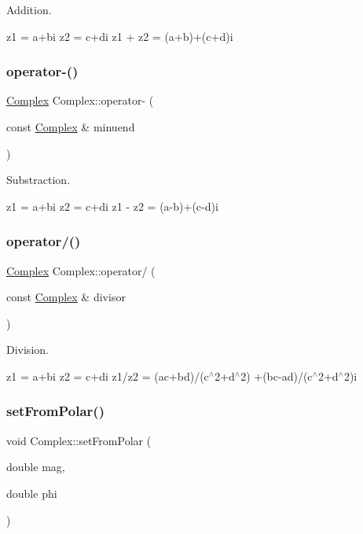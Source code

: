 Addition. 

z1 = a+bi z2 = c+di z1 + z2 = (a+b)+(c+d)i \mbox{\label{class_complex_a8f880f1056308d876fd50aad9244e8d2}} 
\subsubsection{\texorpdfstring{operator-\/()}{operator-()}}
{\footnotesize\ttfamily \mbox{\hyperlink{class_complex}{Complex}} Complex\+::operator-\/ (\begin{DoxyParamCaption}\item[{const \mbox{\hyperlink{class_complex}{Complex}} \&}]{minuend }\end{DoxyParamCaption})}



Substraction. 

z1 = a+bi z2 = c+di z1 -\/ z2 = (a-\/b)+(c-\/d)i \mbox{\label{class_complex_a365fd33e7bc67fde80e79c514aab95bc}} 
\subsubsection{\texorpdfstring{operator/()}{operator/()}}
{\footnotesize\ttfamily \mbox{\hyperlink{class_complex}{Complex}} Complex\+::operator/ (\begin{DoxyParamCaption}\item[{const \mbox{\hyperlink{class_complex}{Complex}} \&}]{divisor }\end{DoxyParamCaption})}



Division. 

z1 = a+bi z2 = c+di z1/z2 = (ac+bd)/(c$^\wedge$2+d$^\wedge$2) +(bc-\/ad)/(c$^\wedge$2+d$^\wedge$2)i \mbox{\label{class_complex_a507be49e963cbeab282f9c839a0eea40}} 
\subsubsection{\texorpdfstring{set\+From\+Polar()}{setFromPolar()}}
{\footnotesize\ttfamily void Complex\+::set\+From\+Polar (\begin{DoxyParamCaption}\item[{double}]{mag,  }\item[{double}]{phi }\end{DoxyParamCaption})}




